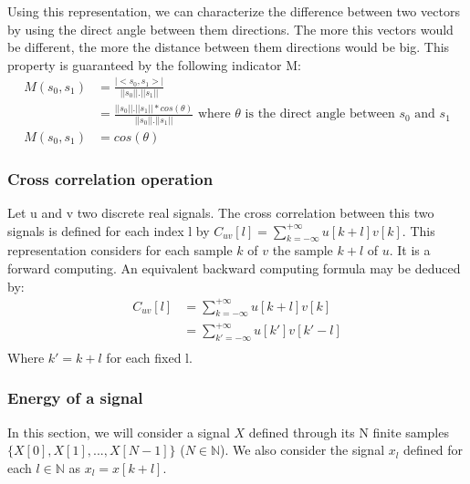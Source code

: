 \documentclass[a4paper]{article}
\begin{document}
Using this representation, we can characterize the difference between two vectors by using the direct angle between them directions.   The more this vectors would be different, the more the distance between them directions would be big.   This property is guaranteed by the following indicator M:
\begin{equation*}
\begin{aligned}
	M(s_{0}, s_{1})	&= \frac{|<s_{0}, s_{1}>|}{||s_{0}|| . ||s_{1}||}\\
    				&= \frac{||s_{0}|| . ||s_{1}|| * cos(\theta)}{||s_{0}|| . ||s_{1}||} \mbox{ where }\theta \mbox{ is the direct angle between } s_{0} \mbox{ and } s_{1}\\
	M(s_{0}, s_{1})	&= cos(\theta)
\end{aligned}
\end{equation*}






	      \subsubsection{Cross correlation operation}
Let u and v two discrete real signals.   The cross correlation between this two signals is defined for each index l by $C_{uv}[l] = \sum_{k=-\infty}^{+\infty}{u[k+l] v[k]}$.
This representation considers for each sample $k$ of $v$ the sample $k+l$ of $u$. It is a forward computing.  An equivalent backward computing formula may be deduced by:
\begin{equation*}
\begin{aligned}
	C_{uv}[l]&= \sum_{k=-\infty}^{+\infty}{u[k+l] v[k]} \\
	 		&= \sum_{k'=-\infty}^{+\infty}{u[k'] v[k'-l]} \\
\end{aligned}
\end{equation*}
Where $k' = k+l$ for each fixed l.





			\subsubsection{Energy of a signal}
In this section, we will consider a signal $X$ defined through its N finite samples $\{X[0], X[1], ..., X[N-1]\}$ ($N \in \mathbb{N}$).   We also consider the signal $x_{l}$ defined for each $l \in \mathbb{N}$ as $x_{l} = x[k+l]$.\\
\end{document}
